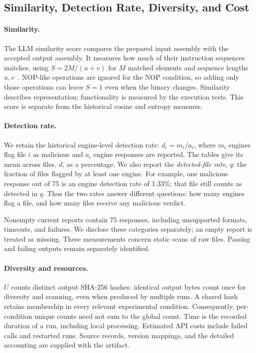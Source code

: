 \subsection{Similarity, Detection Rate, Diversity, and Cost}
\paragraph{Similarity.}
The LLM similarity score compares the prepared input assembly with the
accepted output assembly. It measures how much of their instruction
sequences matches, using $S=2M/(u+v)$ for $M$ matched elements and sequence
lengths $u,v$~\cite{python_difflib}. NOP-like operations are ignored for
the NOP condition, so adding only those operations can leave $S=1$ even
when the binary changes. Similarity describes representation; functionality
is measured by the execution tests. This score is separate from the
historical cosine and entropy measures.

\paragraph{Detection rate.}
We retain the historical engine-level detection rate:
$d_i=m_i/a_i$, where $m_i$ engines flag file $i$ as malicious and $a_i$
engine responses are reported. The tables give its mean across files,
$\overline d$, as a percentage. We also report the \emph{detected-file
rate}, $q$: the fraction of files flagged by at least one engine.
For example, one malicious response out of 75 is an engine detection rate
of 1.33\%; that file still counts as detected in $q$. Thus the two rates
answer different questions: how many engines flag a file, and how many
files receive any malicious verdict.

Nonempty current reports contain 75 responses, including unsupported
formats, timeouts, and failures. We disclose these categories separately;
an empty report is treated as missing. These measurements concern static
scans of raw files. Passing and failing outputs remain separately identified.

\paragraph{Diversity and resources.}
$U$ counts distinct output SHA-256 hashes: identical output bytes count
once for diversity and scanning, even when produced by multiple runs.
A shared hash retains membership in every relevant experimental condition.
Consequently, per-condition unique counts need not sum to the global count.
Time is the recorded duration of a run, including local processing.
Estimated API costs include failed calls and restarted runs. Source records,
version mappings, and the detailed accounting are supplied with the artifact.
